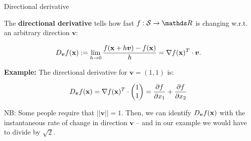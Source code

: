 \documentclass[11pt,compress,t,notes=noshow, xcolor=table]{beamer}
\begin{document}
\begin{vbframe}{Directional derivative}

The \textbf{directional derivative} tells how fast $f: \mathcal{S} \to \R$ is changing w.r.t. an arbitrary direction $\bm{v}$: 

 $$
   D_{\bm{v}} f(\mathbf{x}) := \lim_{h \to 0} \frac{f(\mathbf{x} + h \bm v) - f(\mathbf{x})}{h} = \nabla f(\mathbf{x})^T \cdot \bm v. 
 $$

 
\textbf{Example: } The directional derivative for $\bm{v} = (1, 1)$ is:

$$
D_{\bm{v}} f(\mathbf{x}) = \nabla f(\mathbf{x})^T \cdot \begin{pmatrix} 1 \\1\end{pmatrix} = \frac{\partial f}{\partial x_1} + \frac{\partial f}{\partial x_2}
$$

NB: Some people require that $||\bm{v}|| = 1$. Then, we can identify $D_{\bm{v}} f(\mathbf{x})$ with the instantaneous rate of change in direction $\bm{v}$ -- and in our example we would have to divide by $\sqrt{2}$.

\end{vbframe}
\end{document}
